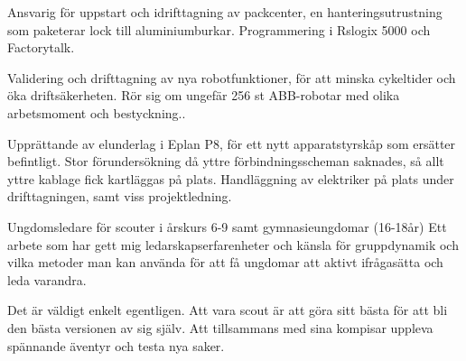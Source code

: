 \documentclass[10pt,a4paper,ragged2e,withhyper]{altacv}
\begin{document}
\begin{paracol}{2}
\divider

Ansvarig för uppstart och idrifttagning av packcenter, en hanteringsutrustning
som paketerar lock till aluminiumburkar. Programmering i Rslogix 5000 och
Factorytalk.

\divider
\newpage
{}
Validering och drifttagning av nya robotfunktioner, för att minska cykeltider och
öka driftsäkerheten. Rör sig om ungefär 256 st ABB-robotar med olika
arbetsmoment och bestyckning..

\divider

Upprättande av elunderlag i Eplan P8, för ett nytt apparatstyrskåp som ersätter
befintligt. Stor förundersökning då yttre förbindningsscheman saknades, så allt
yttre kablage fick kartläggas på plats. Handläggning av elektriker på plats under
drifttagningen, samt viss projektledning.

\medskip




Ungdomsledare för scouter i årskurs 6-9 samt gymnasieungdomar (16-18år)
Ett arbete som har gett mig ledarskapserfarenheter och känsla för gruppdynamik och vilka metoder man kan använda för att få ungdomar att aktivt ifrågasätta och leda varandra.

\medskip

Det är väldigt enkelt egentligen. Att vara scout är att göra sitt bästa för att bli den bästa versionen av sig själv. Att tillsammans med sina kompisar uppleva spännande äventyr och testa nya saker.

\divider


\end{paracol}
\end{document}
